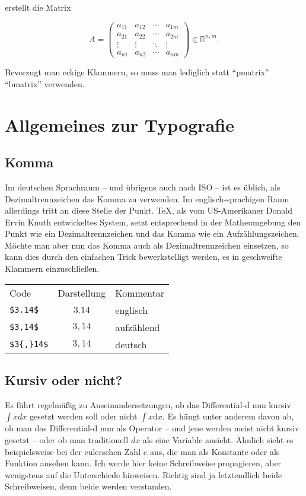 erstellt die Matrix

\begin{equation}
	A =
	\begin{pmatrix}
		a_{11} & a_{12} & \cdots & a_{1m}\\
		a_{21} & a_{22} & \cdots & a_{2m}\\
		\vdots & \vdots & \ddots & \vdots\\
		a_{n1} & a_{n2} & \cdots & a_{nm}
	\end{pmatrix}
	\in \mathds R^{n,m}.
\end{equation}

Bevorzugt man eckige Klammern, so muss man lediglich statt \enquote{pmatrix} \enquote{bmatrix} verwenden.

\section{Allgemeines zur Typografie}
\subsection{Komma}
Im deutschen Sprachraum -- und übrigens auch nach ISO -- ist es üblich, als Dezimaltrennzeichen das Komma zu verwenden. Im englisch-sprachigen Raum allerdings tritt an diese Stelle der Punkt. TeX, als vom US-Amerikaner Donald Ervin Knuth entwickeltes System, setzt entsprechend in der Matheumgebung den Punkt wie ein Dezimaltrennzeichen und das Komma wie ein Aufzählungszeichen. Möchte man aber nun das Komma auch als Dezimaltrennzeichen einsetzen, so kann dies durch den einfachen Trick bewerkstelligt werden, es in geschweifte Klammern einzuschließen.

\begin{tabular}{lcl}
Code            & Darstellung & Kommentar\\
\verb|$3.14$|   & $3.14$      & englisch\\
\verb|$3,14$|   & $3,14$      & aufzählend\\
\verb|$3{,}14$| & $3{,}14$    & deutsch
\end{tabular}

\subsection{Kursiv oder nicht?}
Es führt regelmäßig zu Auseinandersetzungen, ob das Differential-d nun kursiv $\int xdx$ gesetzt werden soll oder nicht $\int x\mathrm dx$. Es hängt unter anderem davon ab, ob man das Differential-d nun als Operator -- und jene werden meist nicht kursiv gesetzt -- oder ob man traditionell $dx$ als eine Variable ansieht. Ähnlich sieht es beispielsweise bei der eulerschen Zahl $e$ aus, die man als Konstante oder als Funktion ansehen kann. Ich werde hier keine Schreibweise propagieren, aber wenigstens auf die Unterschiede hinweisen. Richtig sind ja letztendlich beide Schreibweisen, denn beide werden verstanden.

